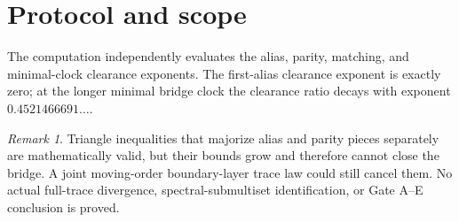 \documentclass[11pt]{article}
\theoremstyle{remark}\newtheorem{remark}[theorem]{Remark}
\begin{document}
\section{Protocol and scope}
The computation independently evaluates the alias, parity, matching, and
minimal-clock clearance exponents.  The first-alias clearance exponent is
exactly zero; at the longer minimal bridge clock the clearance ratio decays
with exponent $0.4521466691\ldots$.

\begin{remark}
Triangle inequalities that majorize alias and parity pieces separately are
mathematically valid, but their bounds grow and therefore cannot close the
bridge.  A joint moving-order boundary-layer trace law could still cancel
them.  No actual full-trace divergence, spectral-submultiset identification,
or Gate A--E conclusion is proved.
\end{remark}
\end{document}
